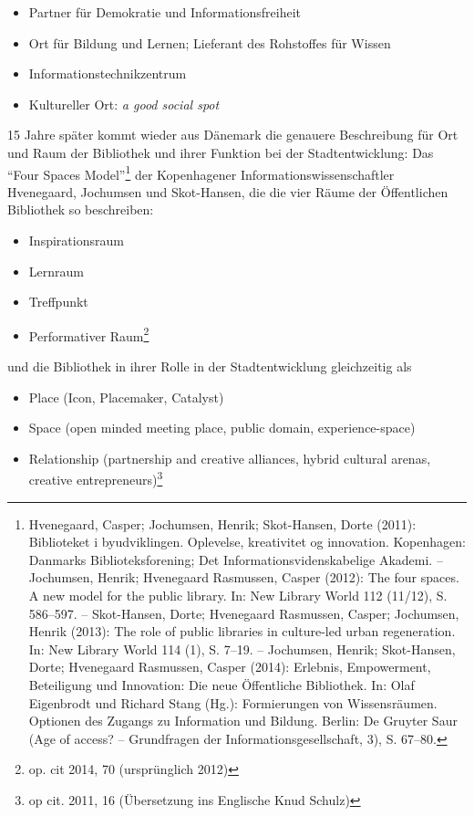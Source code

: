 \begin{itemize}
\item
  Partner für Demokratie und Informationsfreiheit
\item
  Ort für Bildung und Lernen; Lieferant des Rohstoffes für Wissen
\item
  Informationstechnikzentrum
\item
  Kultureller Ort: \emph{a good social spot}
\end{itemize}

15 Jahre später kommt wieder aus Dänemark die genauere Beschreibung für
Ort und Raum der Bibliothek und ihrer Funktion bei der Stadtentwicklung:
Das \enquote{Four Spaces Model}\footnote{Hvenegaard, Casper; Jochumsen, Henrik;
  Skot-Hansen, Dorte (2011): Biblioteket i byudviklingen. Oplevelse,
  kreativitet og innovation. Kopenhagen: Danmarks Biblioteksforening;
  Det Informationsvidenskabelige Akademi. -- Jochumsen, Henrik;
  Hvenegaard Rasmussen, Casper (2012): The four spaces. A new model for
  the public library. In: New Library World 112 (11/12), S. 586--597. --
  Skot-Hansen, Dorte; Hvenegaard Rasmussen, Casper; Jochumsen, Henrik
  (2013): The role of public libraries in culture-led urban
  regeneration. In: New Library World 114 (1), S. 7--19. -- Jochumsen,
  Henrik; Skot-Hansen, Dorte; Hvenegaard Rasmussen, Casper (2014):
  Erlebnis, Empowerment, Beteiligung und Innovation: Die neue
  Öffentliche Bibliothek. In: Olaf Eigenbrodt und Richard Stang (Hg.):
  Formierungen von Wissensräumen. Optionen des Zugangs zu Information
  und Bildung. Berlin: De Gruyter Saur (Age of access? -- Grundfragen
  der Informationsgesellschaft, 3), S. 67--80.} der Kopenhagener
Informationswissenschaftler Hvenegaard, Jochumsen und Skot-Hansen, die
die vier Räume der Öffentlichen Bibliothek so beschreiben:

\begin{itemize}
\item
  Inspirationsraum
\item
  Lernraum
\item
  Treffpunkt
\item
  Performativer Raum\footnote{op. cit 2014, 70 (ursprünglich 2012)}
\end{itemize}

und die Bibliothek in ihrer Rolle in der Stadtentwicklung gleichzeitig
als

\begin{itemize}
\item
  Place (Icon, Placemaker, Catalyst)
\item
  Space (open minded meeting place, public domain, experience-space)
\item
  Relationship (partnership and creative alliances, hybrid cultural
  arenas, creative entrepreneurs)\footnote{op cit. 2011, 16 (Übersetzung
    ins Englische Knud Schulz)}
\end{itemize}

